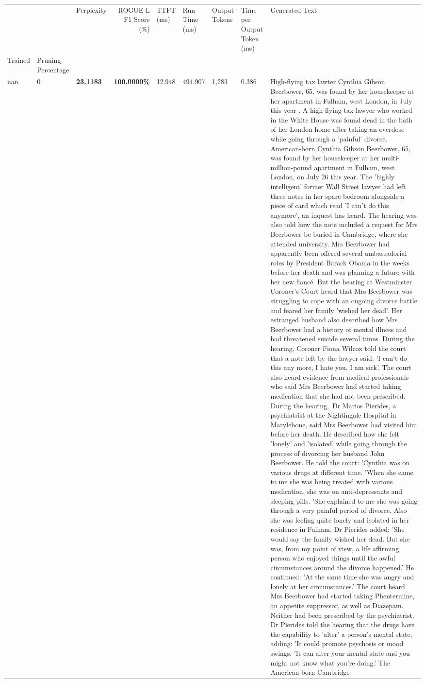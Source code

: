 \begin{table}[H]
\label{tab:evaluation-pipeline-13}
\begin{tabular}{lllrlllll}
\toprule
 &  & Perplexity & ROGUE-L F1 Score (\%) & TTFT (ms) & Run Time (ms) & Output Tokens & Time per Output Token (ms) & Generated Text \\
Trained & Pruning Percentage &  &  &  &  &  &  &  \\
\midrule
nan & 0 & \bfseries 23.1183 & \bfseries 100.0000\% & 12.948 & 494.907 & 1,283 & 0.386 & High-flying tax lawter Cynthia Gibson Beerbower, 65, was found by her housekeeper at her apartment in Fulham, west London, in July this year . A high-flying tax lawyer who worked in the White House was found dead in the bath of her London home after taking an overdose while going through a 'painful' divorce. American-born Cynthia Gibson Beerbower, 65, was found by her housekeeper at her multi-million-pound apartment in Fulham, west London, on July 26 this year. The 'highly intelligent' former Wall Street lawyer had left three notes in her spare bedroom alongside a piece of card which read 'I can't do this anymore', an inquest has heard. The hearing was also told how the note included a request for Mrs Beerbower be buried in Cambridge, where she attended university. Mrs Beerbower had apparently been offered several ambassadorial roles by President Barack Obama in the weeks before her death and was planning a future with her new fiancé. But the hearing at Westminster Coroner's Court heard that Mrs Beerbower was struggling to cope with an ongoing divorce battle and feared her family 'wished her dead'. Her estranged husband also described how Mrs Beerbower had a history of mental illness and had threatened suicide several times. During the hearing, Coroner Fiona Wilcox told the court that a note left by the lawyer said: 'I can't do this any more, I hate you, I am sick'. The court also heard evidence from medical professionals who said Mrs Beerbower had started taking medication that she had not been prescribed. During the hearing, Dr Marios Pierides, a psychiatrist at the Nightingale Hospital in Marylebone, said Mrs Beerbower had visited him before her death. He described how she felt 'lonely' and 'isolated' while going through the process of divorcing her husband John Beerbower. He told the court: 'Cynthia was on various drugs at different time. 'When she came to me she was being treated with various medication, she was on anti-depressants and sleeping pills. 'She explained to me she was going through a very painful period of divorce. Also she was feeling quite lonely and isolated in her residence in Fulham. Dr Pierides added: 'She would say the family wished her dead. But she was, from my point of view, a life affirming person who enjoyed things until the awful circumstances around the divorce happened.' He continued: 'At the same time she was angry and lonely at her circumstances.' The court heard Mrs Beerbower had started taking Phentermine, an appetite suppressor, as well as Diazepam. Neither had been prescribed by the psychiatrist. Dr Pierides told the hearing that the drugs have the capability to 'alter' a person's mental state, adding: 'It could promote psychosis or mood swings. 'It can alter your mental state and you might not know what you're doing.' The American-born Cambridge 
\end{tabular}
\end{table}
